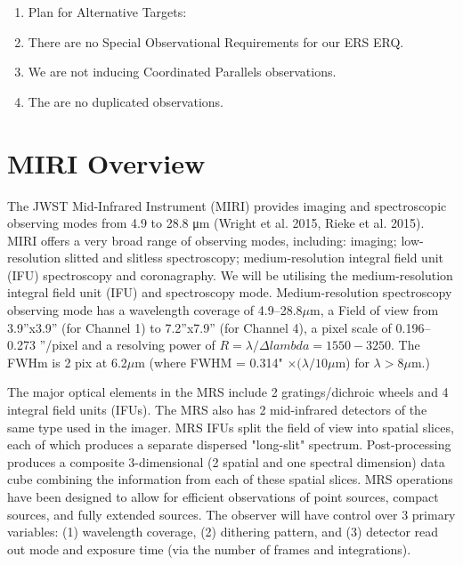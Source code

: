 \smallskip \smallskip
\noindent


\begin{enumerate}[label=\alph*]
    \item{Plan for Alternative Targets: }
      
    \item{There are no Special Observational Requirements for our ERS ERQ.} 

    \item{We are not inducing Coordinated Parallels observations.}

    \item{The are no duplicated observations.} 
\end{enumerate}

\section{MIRI Overview}
The JWST Mid-Infrared Instrument (MIRI) provides imaging and
spectroscopic observing modes from 4.9 to 28.8 μm (Wright et al. 2015,
Rieke et al. 2015). MIRI offers a very broad range of observing modes,
including: imaging; low-resolution slitted and slitless spectroscopy;
medium-resolution integral field unit (IFU) spectroscopy and
coronagraphy.  We will be utilising the medium-resolution integral
field unit (IFU) and spectroscopy mode.  Medium-resolution
spectroscopy observing mode has a wavelength coverage of
4.9–28.8$\mu$m, a Field of view from 3.9''x3.9'' (for Channel 1) to
7.2''x7.9'' (for Channel 4), a pixel scale of 0.196–0.273 ''/pixel and
a resolving power of $R=\lambda / \Delta lambda = 1550-3250$.  The
FWHm is 2 pix at 6.2$\mu$m (where FWHM = 0.314" $\times (\lambda / 10
\mu$m) for $\lambda > 8\mu$m.)

\smallskip \smallskip
\noindent
The major optical elements in the MRS include 2 gratings/dichroic
wheels and 4 integral field units (IFUs). The MRS also has 2
mid-infrared detectors of the same type used in the imager.  MRS IFUs
split the field of view into spatial slices, each of which produces a
separate dispersed "long-slit" spectrum. Post-processing produces a
composite 3-dimensional (2 spatial and one spectral dimension) data
cube combining the information from each of these spatial slices.  MRS
operations have been designed to allow for efficient observations of
point sources, compact sources, and fully extended sources. The
observer will have control over 3 primary variables: (1) wavelength
coverage, (2) dithering pattern, and (3) detector read out mode and
exposure time (via the number of frames and integrations).

